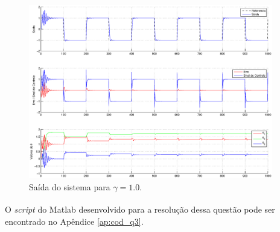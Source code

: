 \begin{figure}[htb]
    \centering
    \includegraphics[width=0.95\textwidth]{imgs/questao3/saida_gamma_1.0.eps}
    \caption{Saída do sistema para $\gamma = 1.0$.}
    \label{fig:q3_sistema}
    \label{fig:q3_saida_gamma_1.0}
\end{figure}

O {\it script} do Matlab\textsuperscript{\textregistered} desenvolvido para a
resolução dessa questão pode ser encontrado no Apêndice \ref{ap:cod_q3}.
